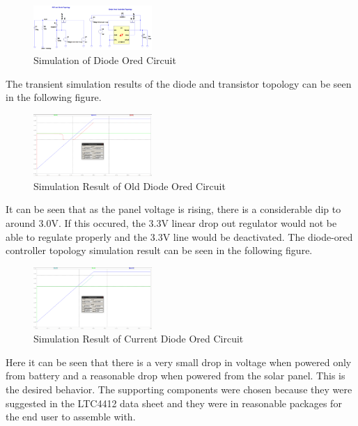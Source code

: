 \documentclass{article}
\begin{document}
{\begin{figure}[H]
	\centering
	\includegraphics[width=0.4\textwidth]{DiodeORSIM}
	\caption{Simulation of Diode Ored Circuit}
	\label{fig:doredsim}
\end{figure}

The transient simulation results of the diode and transistor topology can be seen in the following figure.

\begin{figure}[H]
	\centering
	\includegraphics[width=0.4\textwidth]{DiodeORres1}
	\caption{Simulation Result of Old Diode Ored Circuit}
	\label{fig:doredsimres1}
\end{figure}
It can be seen that as the panel voltage is rising, there is a considerable dip to around 3.0V. If this occured, the 3.3V linear drop out regulator would not be able to regulate properly and the 3.3V line would be deactivated. The diode-ored controller topology simulation result can be seen in the following figure.
\begin{figure}[H]
	\centering
	\includegraphics[width=0.4\textwidth]{DiodeORres2}
	\caption{Simulation Result of Current Diode Ored Circuit}
	\label{fig:doredsimres2}
\end{figure}

Here it can be seen that there is a very small drop in voltage when powered only from battery and a reasonable drop when powered from the solar panel. This is the desired behavior. The supporting components were chosen because they were suggested in the LTC4412 data sheet and they were in reasonable packages for the end user to assemble with.

}
\end{document}
